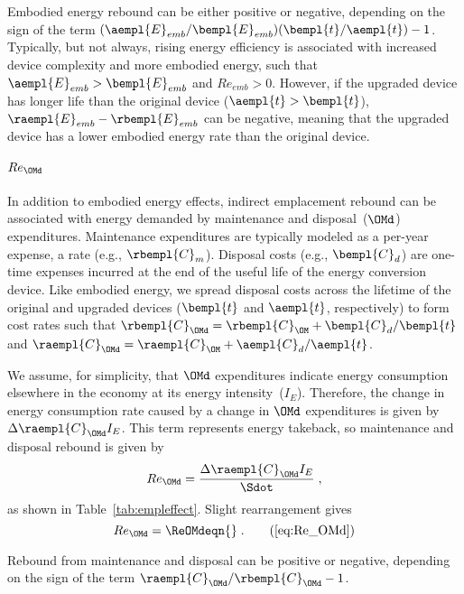 Embodied energy rebound can be either positive or negative, depending on 
the sign of the term
$(\aempl{E}_{emb}/\bempl{E}_{emb})(\bempl{t}/\aempl{t}) - 1$.
Typically, but not always,
rising energy efficiency is associated with increased device complexity
and more embodied energy,
such that $\aempl{E}_{emb} > \bempl{E}_{emb}$ and $Re_{emb} > 0$.
However, if the upgraded device has longer life than the original device
($\aempl{t} > \bempl{t}$),
$\raempl{E}_{emb} - \rbempl{E}_{emb}$ can be negative,
meaning that the upgraded device has a lower embodied energy rate than the original device.


\paragraph{$Re_{\OMd}$} 
\label{sec:Re_OMd}

In addition to embodied energy effects, 
indirect emplacement rebound 
can be associated with energy demanded by maintenance and disposal~($\OMd$) expenditures.
Maintenance expenditures are typically modeled as a per-year expense, 
a rate (e.g., $\rbempl{C}_m$).
Disposal costs (e.g., $\bempl{C}_d$) are one-time expenses incurred at the end of the useful life of the energy conversion device.
Like embodied energy, we spread disposal costs across the lifetime 
of the original and upgraded devices ($\bempl{t}$ and $\aempl{t}$, respectively)
to form cost rates such that $\rbempl{C}_{\OMd} = \rbempl{C}_{\OM} + \bempl{C}_d/\bempl{t}$
and
$\raempl{C}_{\OMd} = \raempl{C}_{\OM} + \aempl{C}_d/\aempl{t}$.

We assume, for simplicity, that $\OMd$ expenditures indicate energy consumption
elsewhere in the economy at its energy intensity~($I_E$).
Therefore, the change in energy consumption rate caused by a change in $\OMd$ expenditures
is given by $\Delta \raempl{C}_{\OMd} I_E$.
This term represents energy takeback, so maintenance and disposal rebound is given by
%
\begin{equation} \label{eq:Re_OMd_def}
  Re_{\OMd} = \frac{\Delta \raempl{C}_{\OMd} I_E}{\Sdot} \; ,
\end{equation}
%
as shown in Table~\ref{tab:empleffect}.
Slight rearrangement gives
%
\begin{equation}
  Re_{\OMd} = \ReOMdeqn{} \; . \tag{\ref{eq:Re_OMd}}
\end{equation}

Rebound from maintenance and disposal can be positive or negative,
depending on the sign of the term $\raempl{C}_{\OMd}/\rbempl{C}_{\OMd} - 1$.


